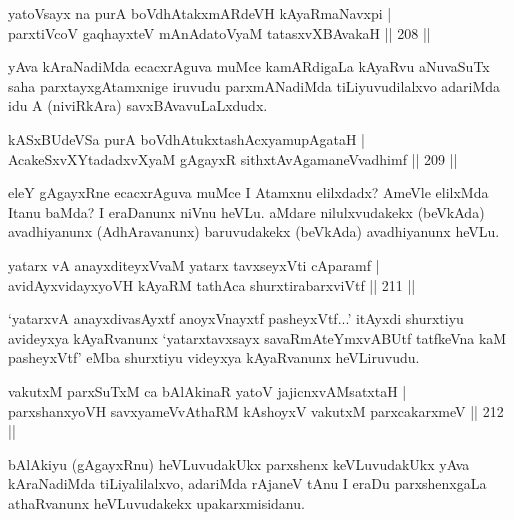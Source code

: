 \begin{shl}
yatoV\s sayx na purA boVdhAtakxmARdeVH kAyaRmaNavxpi |\\
parxtiVcoV gaqhayxteV mAnAdatoV\s yaM tatasxvXBAvakaH \hfill || 208 ||
\end{shl}

\begin{artha}
yAva kAraNadiMda ecacxrAguva muMce kamARdigaLa kAyaRvu aNuvaSuTx saha parxtayxgAtamxnige iruvudu parxmANadiMda tiLiyuvudilalxvo adariMda idu A (niviRkAra) savxBAvavuLaLxdudx.
\end{artha}


\begin{shl}
kASxBUdeVSa purA boVdhAtukxtashAcxyamupAgataH |\\
AcakeSxvXYtadadxvXyaM gAgayxR sithxtAvAgamaneV\s vadhimf \hfill || 209 ||
\end{shl}

\begin{artha}
eleY gAgayxRne ecacxrAguva muMce I Atamxnu elilxdadx? AmeVle elilxMda Itanu baMda? I eraDanunx niVnu heVLu. aMdare nilulxvudakekx (beVkAda) avadhiyanunx (AdhAravanunx) baruvudakekx (beVkAda) avadhiyanunx heVLu.
\end{artha}


\begin{shl}
yatarx vA anayxditeyxVvaM yatarx tavxseyxVti cAparamf |\\
avidAyxvidayxyoVH kAyaRM tathAca shurxtirabarxviVtf \hfill || 211 ||
\end{shl}

\begin{artha}
`yatarxvA anayxdivasAyxtf anoyxV\s nayxtf pasheyxVtf...' itAyxdi shurxtiyu avideyxya kAyaRvanunx `yatarxtavxsayx savaRmAteYmxvABUtf tatfkeVna kaM pasheyxVtf' eMba shurxtiyu videyxya kAyaRvanunx heVLiruvudu.
\end{artha}

\begin{shl}
vakutxM parxSuTxM ca bAlAkinaR yatoV jajicnxvAMsatxtaH |\\
parxshanxyoVH savxyameVvAthaRM kAshoyxV vakutxM parxcakarxmeV \hfill || 212 ||
\end{shl}

\begin{artha}
bAlAkiyu (gAgayxRnu) heVLuvudakUkx parxshenx keVLuvudakUkx yAva kAraNadiMda tiLiyalilalxvo, adariMda rAjaneV tAnu I eraDu parxshenxgaLa athaRvanunx heVLuvudakekx upakarxmisidanu.
\end{artha}


